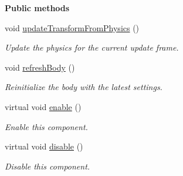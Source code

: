 \begin{Indent}\textbf{ Public methods}\par
\begin{DoxyCompactItemize}
\item 
\mbox{\label{classrev_1_1_rigid_body_component_afd61876ead736f2c1b2810182cb85899}} 
void \mbox{\hyperlink{classrev_1_1_rigid_body_component_afd61876ead736f2c1b2810182cb85899}{update\+Transform\+From\+Physics}} ()
\begin{DoxyCompactList}\small\item\em Update the physics for the current update frame. \end{DoxyCompactList}\item 
\mbox{\label{classrev_1_1_rigid_body_component_af77b5995f4cbd025ea1b9037928d449c}} 
void \mbox{\hyperlink{classrev_1_1_rigid_body_component_af77b5995f4cbd025ea1b9037928d449c}{refresh\+Body}} ()
\begin{DoxyCompactList}\small\item\em Reinitialize the body with the latest settings. \end{DoxyCompactList}\item 
\mbox{\label{classrev_1_1_rigid_body_component_ae53822395d5fec4ec609c6240236d4a6}} 
virtual void \mbox{\hyperlink{classrev_1_1_rigid_body_component_ae53822395d5fec4ec609c6240236d4a6}{enable}} ()
\begin{DoxyCompactList}\small\item\em Enable this component. \end{DoxyCompactList}\item 
\mbox{\label{classrev_1_1_rigid_body_component_a4be42fa91b015b271d0e805a74cc24f8}} 
virtual void \mbox{\hyperlink{classrev_1_1_rigid_body_component_a4be42fa91b015b271d0e805a74cc24f8}{disable}} ()
\begin{DoxyCompactList}\small\item\em Disable this component. \end{DoxyCompactList}\end{DoxyCompactItemize}
\end{Indent}
